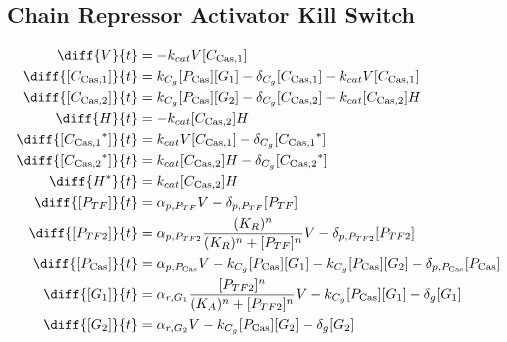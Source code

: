 \subsection{Chain Repressor Activator Kill Switch}
\label{s:Chain_Repressor_Activator_Kill_Switch}

\begin{align}
\diff{\vectorGen{}}{t} & = - \casCutRate{{}}\vectorGen{}\conc{\cplx{\cas}{1}}\\
\diff{\conc{\cplx{\cas}{1}}}{t} & =  \gRnaBind{}\conc{\proSp{\cas{}}}\conc{\gRna{1}} - \casCompDegradeRate{}\conc{\cplx{\cas}{1}} - \casCutRate{{}}\vectorGen{}\conc{\cplx{\cas}{1}}\\
\diff{\conc{\cplx{\cas}{2}}}{t} & =  \gRnaBind{}\conc{\proSp{\cas{}}}\conc{\gRna{2}} - \casCompDegradeRate{}\conc{\cplx{\cas}{2}} - \casCutRate{{}}\conc{\cplx{\cas}{2}}\hostGen{}\\
\diff{\hostGen{}}{t} & = - \casCutRate{{}}\conc{\cplx{\cas}{2}}\hostGen{}\\
\diff{\conc{\bound{\cplx{\cas}{1}}}}{t} & =  \casCutRate{{}}\vectorGen{}\conc{\cplx{\cas}{1}} - \casCompDegradeRate{}\conc{\bound{\cplx{\cas}{1}}}\\
\diff{\conc{\bound{\cplx{\cas}{2}}}}{t} & =  \casCutRate{{}}\conc{\cplx{\cas}{2}}\hostGen{} - \casCompDegradeRate{}\conc{\bound{\cplx{\cas}{2}}}\\
\diff{\edited{\hostGen{}}}{t} & =  \casCutRate{{}}\conc{\cplx{\cas}{2}}\hostGen{}\\
\diff{\conc{\proSp{TF}}}{t} & =  \txtlRate{\proSp{TF}}\vectorGen{} - \proDegradeRate{\proSp{TF}}\conc{\proSp{TF}}\\
\diff{\conc{\proSp{TF2}}}{t} & =  \txtlRate{\proSp{TF2}}\frac{(K_R)^n}{(K_R)^n + \conc{\proSp{TF}}^n}\vectorGen{} - \proDegradeRate{\proSp{TF2}}\conc{\proSp{TF2}}\\
\diff{\conc{\proSp{\cas{}}}}{t} & =  \txtlRate{\proSp{\cas{}}}\vectorGen{} - \gRnaBind{}\conc{\proSp{\cas{}}}\conc{\gRna{1}} - \gRnaBind{}\conc{\proSp{\cas{}}}\conc{\gRna{2}} - \proDegradeRate{\proSp{\cas{}}}\conc{\proSp{\cas{}}}\\
\diff{\conc{\gRna{1}}}{t} & =  \txRate{\gRna{1}}\frac{\conc{\proSp{TF2}}^n}{(K_A)^n + \conc{\proSp{TF2}}^n}\vectorGen{} - \gRnaBind{}\conc{\proSp{\cas{}}}\conc{\gRna{1}} - \rnaDegradeRate{}\conc{\gRna{1}}\\
\diff{\conc{\gRna{2}}}{t} & =  \txRate{\gRna{2}}\vectorGen{} - \gRnaBind{}\conc{\proSp{\cas{}}}\conc{\gRna{2}} - \rnaDegradeRate{}\conc{\gRna{2}}
\end{align}

